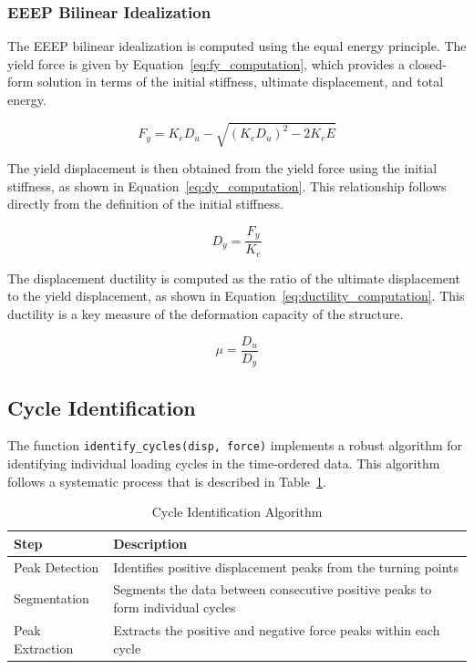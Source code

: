 \documentclass[11pt,a4paper]{article}
\begin{document}
\subsubsection{EEEP Bilinear Idealization}

The EEEP bilinear idealization is computed using the equal energy principle. The yield force is given by Equation~\ref{eq:fy_computation}, which provides a closed-form solution in terms of the initial stiffness, ultimate displacement, and total energy.

\begin{equation}
F_y = K_e D_u - \sqrt{(K_e D_u)^2 - 2 K_e E}
\label{eq:fy_computation}
\end{equation}

The yield displacement is then obtained from the yield force using the initial stiffness, as shown in Equation~\ref{eq:dy_computation}. This relationship follows directly from the definition of the initial stiffness.

\begin{equation}
D_y = \frac{F_y}{K_e}
\label{eq:dy_computation}
\end{equation}

The displacement ductility is computed as the ratio of the ultimate displacement to the yield displacement, as shown in Equation~\ref{eq:ductility_computation}. This ductility is a key measure of the deformation capacity of the structure.

\begin{equation}
\mu = \frac{D_u}{D_y}
\label{eq:ductility_computation}
\end{equation}

\subsection{Cycle Identification}

The function \texttt{identify\_cycles(disp, force)} implements a robust algorithm for identifying individual loading cycles in the time-ordered data. This algorithm follows a systematic process that is described in Table~\ref{tab:cycle_algorithm}.

\begin{table}[h]
\centering
\caption{Cycle Identification Algorithm}\label{tab:cycle_algorithm}
\begin{tabular}{p{4cm}p{10cm}}
\toprule
\textbf{Step} & \textbf{Description} \\
\midrule
Peak Detection & Identifies positive displacement peaks from the turning points \\
Segmentation & Segments the data between consecutive positive peaks to form individual cycles \\
Peak Extraction & Extracts the positive and negative force peaks within each cycle \\
\bottomrule
\end{tabular}
\end{table}
\end{document}
